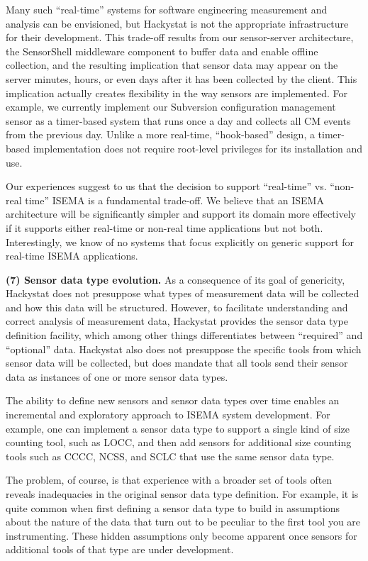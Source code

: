 \documentclass[10pt,twocolumn]{article}
\begin{document}
Many such ``real-time'' systems for software engineering measurement and
analysis can be envisioned, but Hackystat is not the appropriate
infrastructure for their development.  This trade-off results from our
sensor-server architecture, the SensorShell middleware component to buffer
data and enable offline collection, and the resulting implication that
sensor data may appear on the server minutes, hours, or even days after it
has been collected by the client. This implication actually creates
flexibility in the way sensors are implemented.  For example, we currently
implement our Subversion configuration management sensor as a timer-based
system that runs once a day and collects all CM events from the previous
day.  Unlike a more real-time, ``hook-based'' design, a timer-based
implementation does not require root-level privileges for its installation
and use.

Our experiences suggest to us that the decision to support ``real-time''
vs.  ``non-real time'' ISEMA is a fundamental trade-off.  We believe that
an ISEMA architecture will be significantly simpler and support its domain
more effectively if it supports either real-time or non-real time
applications but not both.  Interestingly, we know of no systems that focus
explicitly on generic support for real-time ISEMA applications.

{\bf (7) Sensor data type evolution.} As a consequence of its goal of 
genericity, Hackystat does not presuppose what types of measurement data 
will be collected and how this data will be structured.  However, to 
facilitate understanding and correct analysis of measurement data, 
Hackystat provides the sensor data type definition facility, which 
among other things differentiates between ``required'' and ``optional''
data.  Hackystat also does not presuppose the specific tools from which
sensor data will be collected, but does mandate that all tools send
their sensor data as instances of one or more sensor data types. 

The ability to define new sensors and sensor data types over time enables
an incremental and exploratory approach to ISEMA system development. For
example, one can implement a sensor data type to support a single kind of 
size counting tool, such as LOCC, and then add sensors for additional 
size counting tools such as CCCC, NCSS, and SCLC that use the same 
sensor data type.  

The problem, of course, is that experience with a broader set of tools
often reveals inadequacies in the original sensor data type definition.
For example, it is quite common when first defining a sensor data type to
build in assumptions about the nature of the data that turn out to be
peculiar to the first tool you are instrumenting. These hidden assumptions
only become apparent once sensors for additional tools of that type are
under development.   
\end{document}
